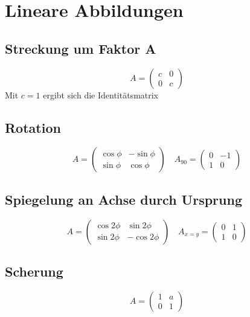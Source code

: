 \documentclass{report}
\begin{document}
\chapter{Lineare Abbildungen}
\section{Streckung um Faktor A}
\begin{equation}A=\left(\begin{matrix}c & 0\\0 & c\end{matrix}\right)\end{equation}
Mit $c = 1$ ergibt sich die Identitätsmatrix
\section{Rotation}
\begin{equation}A=\left(\begin{matrix}\cos{\phi} & -\sin{\phi}\\\sin{\phi} & \cos{\phi}\end{matrix}\right) \quad A_{90}=\left(\begin{matrix}0 & -1\\1 & 0\end{matrix}\right) \end{equation}
\section{Spiegelung an Achse durch Ursprung}
\begin{equation}A=\left(\begin{matrix}\cos{2 \phi} & \sin{2 \phi} \\ \sin{2\phi} & -\cos{2\phi}\end{matrix}\right) \quad A_{x=y}=\left(\begin{matrix}0 & 1\\1 & 0\end{matrix}\right)\end{equation}
\section{Scherung}
\begin{equation}A=\left(\begin{matrix}1 & a \\ 0 & 1\end{matrix}\right)\end{equation}
\end{document}

